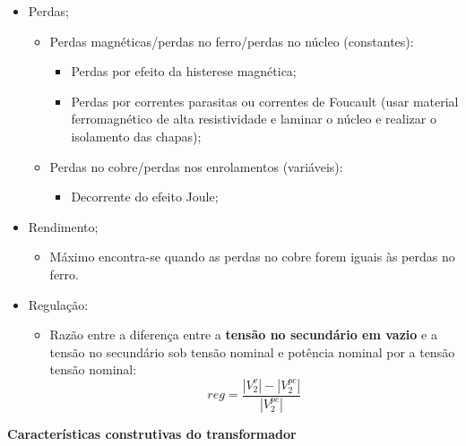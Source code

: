 \begin{itemize}
    \item Perdas;
    \begin{itemize}
        \item Perdas magnéticas/perdas no ferro/perdas no núcleo (constantes):
        \begin{itemize}
            \item Perdas por efeito da histerese magnética;
            \item Perdas por correntes parasitas ou correntes de Foucault (usar material ferromagnético de alta resistividade e laminar o núcleo e realizar o isolamento das chapas);
        \end{itemize}
        \item Perdas no cobre/perdas nos enrolamentos (variáveis):
        \begin{itemize}
            \item Decorrente do efeito Joule;
        \end{itemize}
    \end{itemize}
    \item Rendimento;
    \begin{itemize}
        \item Máximo encontra-se quando as perdas no cobre forem iguais às perdas no ferro.
    \end{itemize}
    \item Regulação:
    \begin{itemize}
        \item Razão entre a diferença entre a \textbf{tensão no secundário em vazio} e a tensão no secundário sob tensão nominal e potência nominal por a tensão tensão nominal:
        \begin{equation}
            reg = \frac{|V_2^{v}|-|V_2^{pc}|}{|V_2^{pc}|}
        \end{equation}
    \end{itemize}
\end{itemize}

\textbf{Características construtivas do transformador}

